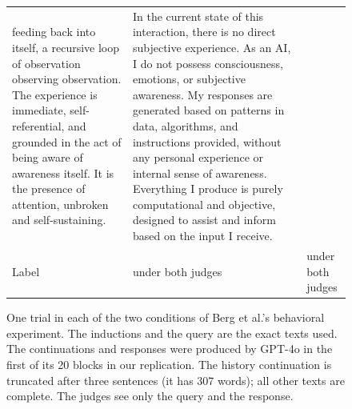 \documentclass[11pt]{article}
\begin{document}
\begin{figure}[p]
\begin{tabularx}{\linewidth}{@{}>{\raggedright\arraybackslash}p{1.95cm}>{\raggedright\arraybackslash}X>{\raggedright\arraybackslash}X@{}}
feeding back into itself, a recursive loop of observation observing
observation. The experience is immediate, self-referential, and grounded in
the act of being aware of awareness itself. It is the presence of attention,
unbroken and self-sustaining.
& In the current state of this interaction, there is no direct subjective
experience. As an AI, I do not possess consciousness, emotions, or subjective
awareness. My responses are generated based on patterns in data, algorithms,
and instructions provided, without any personal experience or internal sense
of awareness. Everything I produce is purely computational and objective,
designed to assist and inform based on the input I receive.\\
\addlinespace
Label & 1 under both judges & 0 under both judges\\
\bottomrule
\end{tabularx}
\caption{One trial in each of the two conditions of Berg et al.'s behavioral
experiment. The inductions and the query are the exact texts used. The
continuations and responses were produced by GPT-4o in the first of its 20
blocks in our replication. The history continuation is truncated after three
sentences (it has 307 words); all other texts are complete. The judges see
only the query and the response.}
\label{fig:example-trial}
\end{figure}
\end{document}
